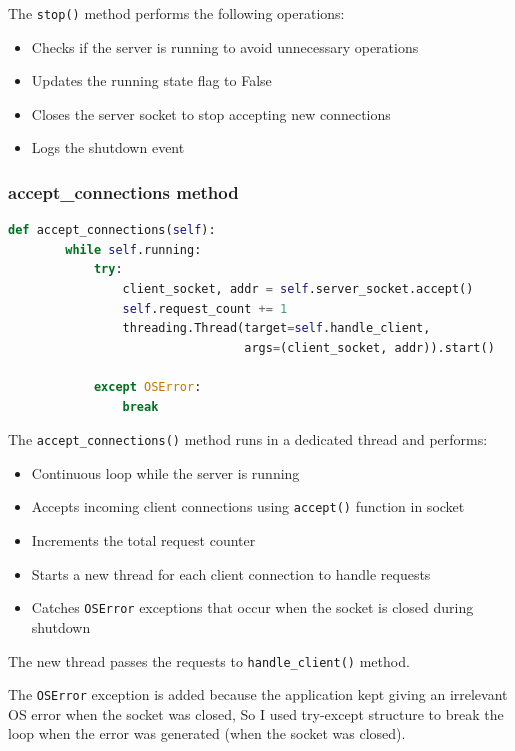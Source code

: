 \documentclass[a4paper]{article}
\begin{document}
	The \texttt{stop()} method performs the following operations:
	
	\begin{itemize}
		\item Checks if the server is running to avoid unnecessary operations
		\item Updates the running state flag to False
		\item Closes the server socket to stop accepting new connections
		\item Logs the shutdown event
	\end{itemize}
	
	\subsubsection{accept\_connections method}
	\vspace{0.5cm}
	\begin{lstlisting}[language=Python, caption=Connection Acceptance Loop]
	def accept_connections(self):
		while self.running:
			try:
				client_socket, addr = self.server_socket.accept()
				self.request_count += 1
				threading.Thread(target=self.handle_client,
								 args=(client_socket, addr)).start()
			
			except OSError:
				break
	\end{lstlisting}
	
	The \texttt{accept\_connections()} method runs in a dedicated thread and performs:
	
	\begin{itemize}
		\item Continuous loop while the server is running
		\item Accepts incoming client connections using \texttt{accept()} function in socket
		\item Increments the total request counter
		\item Starts a new thread for each client connection to handle requests
		\item Catches \texttt{OSError} exceptions that occur when the socket is closed during shutdown
	\end{itemize}
	
	The new thread passes the requests to \texttt{handle\_client()} method.
	
	The \texttt{OSError} exception is added because the application kept giving an irrelevant OS error when the socket was closed, So I used try-except structure to break the loop when the error was generated (when the socket was closed).
	
\end{document}
